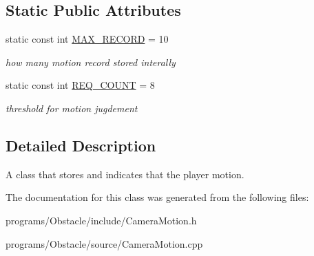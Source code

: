 \subsection*{Static Public Attributes}
\begin{DoxyCompactItemize}
\item 
static const int \hyperlink{class_camera_motion_a03765a27a1c9820d9c52883a5b671331}{M\+A\+X\+\_\+\+R\+E\+C\+O\+RD} = 10\hypertarget{class_camera_motion_a03765a27a1c9820d9c52883a5b671331}{}\label{class_camera_motion_a03765a27a1c9820d9c52883a5b671331}

\begin{DoxyCompactList}\small\item\em how many motion record stored interally \end{DoxyCompactList}\item 
static const int \hyperlink{class_camera_motion_a4dbc2da5975bdd4e5dea9f2d5d3f8d78}{R\+E\+Q\+\_\+\+C\+O\+U\+NT} = 8\hypertarget{class_camera_motion_a4dbc2da5975bdd4e5dea9f2d5d3f8d78}{}\label{class_camera_motion_a4dbc2da5975bdd4e5dea9f2d5d3f8d78}

\begin{DoxyCompactList}\small\item\em threshold for motion jugdement \end{DoxyCompactList}\end{DoxyCompactItemize}


\subsection{Detailed Description}
A class that stores and indicates that the player motion. 

The documentation for this class was generated from the following files\+:\begin{DoxyCompactItemize}
\item 
programs/\+Obstacle/include/Camera\+Motion.\+h\item 
programs/\+Obstacle/source/Camera\+Motion.\+cpp\end{DoxyCompactItemize}
